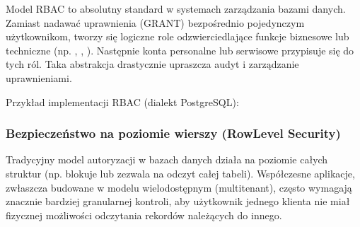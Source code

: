 \documentclass[a4paper,11pt,english,openany,oneside]{sphinxmanual}
\begin{document}
\sphinxAtStartPar
{}

\sphinxAtStartPar
Model RBAC to absolutny standard w systemach zarządzania bazami danych. Zamiast nadawać uprawnienia (GRANT) bezpośrednio pojedynczym użytkownikom, tworzy się logiczne role odzwierciedlające funkcje biznesowe lub techniczne (np. , , ). Następnie konta personalne lub serwisowe przypisuje się do tych ról. Taka abstrakcja drastycznie upraszcza audyt i zarządzanie uprawnieniami.

\sphinxAtStartPar
Przykład implementacji RBAC (dialekt PostgreSQL):

\begin{sphinxVerbatim}[commandchars=\\\{\}]

\end{sphinxVerbatim}


\subsubsection{Bezpieczeństwo na poziomie wierszy (Row\sphinxhyphen{}Level Security)}
\label{\detokenize{rozdzial_2/rozdzial_27/rozdzial_3:bezpieczenstwo-na-poziomie-wierszy-row-level-security}}
\sphinxAtStartPar
Tradycyjny model autoryzacji w bazach danych działa na poziomie całych struktur (np. blokuje lub zezwala na odczyt całej tabeli). Współczesne aplikacje, zwłaszcza budowane w modelu wielodostępnym (multi\sphinxhyphen{}tenant), często wymagają znacznie bardziej granularnej kontroli, aby użytkownik jednego klienta nie miał fizycznej możliwości odczytania rekordów należących do innego.
\end{document}
